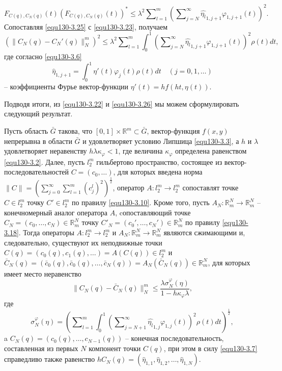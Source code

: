 \begin{equation}\label{equ130-3.25}
F_{C(q),C_N(q)}(t)(F_{C(q),C_N(q)}(t))^*\le \lambda^2   \sum\nolimits_{l=1}^m \left(\sum\nolimits_{j=N}^\infty  \widehat {\eta_l}_{1,j+1}\varphi_{1,j+1}(t)\right)^2.
\end{equation}
Сопоставляя \eqref{equ130-3.25} с \eqref{equ130-3.23}, получаем
\begin{equation}\label{equ130-3.26}
(\|C_N(q)- C_N'(q)\|_N^m)^2\le \lambda^2\sum\nolimits_{l=1}^m\int_{0}^1\left(\sum\nolimits_{j=N}^\infty \widehat {\eta_l}_{1,j+1}\varphi_{1,j+1}(t)\right)^2\rho(t) dt,
\end{equation}
где согласно \eqref{equ130-3.6}
\begin{equation}\label{equ130-3.27}
 \hat \eta_{1,j+1}=\int_{0}^1\eta'(t)\varphi_j(t)\rho(t)dt \quad(j=0,1,\ldots)
\end{equation}
-- коэффициенты Фурье вектор-функции $\eta'(t)=hf(ht,\eta(t))$.

Подводя итоги, из \eqref{equ130-3.22} и \eqref{equ130-3.26}  мы можем сформулировать следующий результат.
\begin{theorem} Пусть область $\bar G$ такова, что $[0,1]\times\mathbb{R}^m\subset \bar G$, вектор-функция $f(x,y)$ непрерывна в области $\bar G$ и удовлетворяет условию Липшица \eqref{equ130-3.3}, а $h$ и $\lambda$ удовлетворяет неравенству $h\lambda\kappa_\varphi<1$, где величина $\kappa_\varphi$ определена равенством \eqref{equ130-3.2}. Далее, пусть $l_2^m$ гильбертово пространство, состоящее из вектор-последовательностей $C=(c_0,\ldots)$, для которых введена норма $\|C\|=\left(\sum\nolimits_{j=0}^{\infty} \sum\nolimits_{l=1}^{m}(c_j^l)^2\right)^\frac12$,   оператор $A: l_2^m\to l_2^m$ сопоставлят точке $C\in l_2^m$ точку $C'\in l_2^m$ по правилу \eqref{equ130-3.10}. Кроме того, пусть $A_N:\mathbb{R}^N_m\to \mathbb{R}^N_m$ -- конечномерный аналог оператора $A$, cопоставляющий точке $C_N=(c_0,\ldots,c_{N})\in \mathbb{R}^N_m $ точку  $C'_N=(c_0',\ldots,c_{N}')\in \mathbb{R}^N_m $ по правилу \eqref{equ130-3.18}.
Тогда операторы $A: l_2^m\to l_2^m$ и $A_N:\mathbb{R}^N_m\to \mathbb{R}^N_m$ являются сжимающими и, следовательно, существуют  их неподвижные точки $C(q)=(c_0(q),c_1(q),\ldots)=A(C(q))\in l_2^m$ и $\bar C_N(q)=(\bar c_0(q),\bar c_0(q),\ldots,\bar c_{N}(q))=A_N(\bar C_N(q))\in \mathbb{R}^N_m$, для которых имеет место неравенство
\begin{equation}\label{equ130-3.28}
\|C_N(q)-\bar C_N(q)\|_N^m\le \frac{\lambda \sigma_N^\varphi(\eta)}{1-h\kappa_\varphi\lambda},
\end{equation}
где
\begin{equation}\label{equ130-3.29}
\sigma_N^\varphi(\eta)=\left(\sum\nolimits_{l=1}^m\int_{0}^1\left(\sum\nolimits_{j=N+1}^\infty \widehat {\eta_l}_{1,j}\varphi_{1,j}(t)\right)^2\rho(t) dt\right)^\frac12,
\end{equation}
 a $C_N(q)=(c_0(q),\ldots,c_{N-1}(q))$ -- конечная последовательность, составленная из первых $N$ компонент точки  $C(q)$, при этом в силу  \eqref{equ130-3.7} справедливо также равенство  $hC_N(q)=(\hat \eta_{1,1},\hat \eta_{1,2}, \ldots, \hat \eta_{1,N})$.
\end{theorem}


